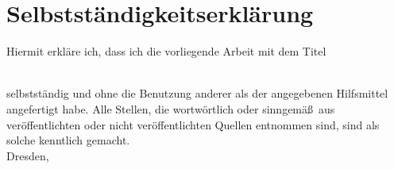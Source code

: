 \makeatletter
\chapter*{Selbstständigkeitserklärung}

\justifying Hiermit erkläre ich, dass ich die vorliegende Arbeit mit dem Titel \\

\vspace{0.5cm}
\centering
{\large\sffamily\mdseries \@title } \\
\vspace{1.0cm}
\justifying

selbstständig und ohne die Benutzung anderer als der angegebenen Hilfsmittel angefertigt habe. Alle Stellen, die wortwörtlich oder sinngemä\ss\ aus veröffentlichten oder nicht veröffentlichten Quellen entnommen sind, sind als solche kenntlich gemacht.\\

\vspace{2.5cm}
Dresden, \@date \hfill \@author
\makeatother